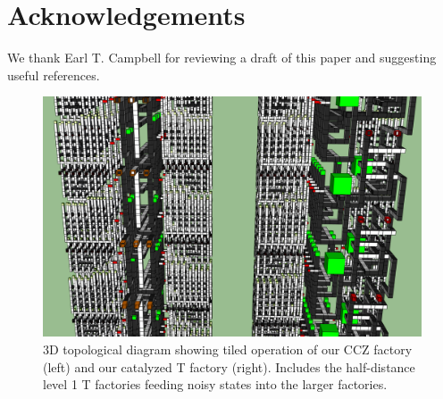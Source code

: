 \documentclass[superscriptaddress,notitlepage,longbibliography]{revtex4-1}
\begin{document}
\section{Acknowledgements}

We thank Earl T. Campbell for reviewing a draft of this paper and suggesting useful references.




\begin{figure}[ht]
  \label{fig:continuous-operation-3d}
    \includegraphics[width=\textwidth,height=\dimexpr\textheight-6\baselineskip,keepaspectratio]{continuous-operation-3d.png}
  \caption{
    3D topological diagram showing tiled operation of our CCZ factory (left) and our catalyzed T factory (right).
    Includes the half-distance level 1 T factories feeding noisy states into the larger factories.
  }
\end{figure}
\end{document}
